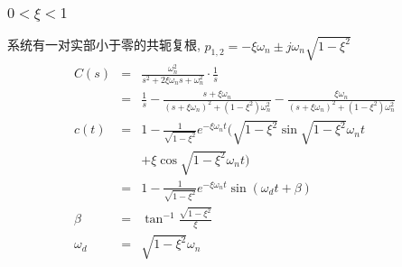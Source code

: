 \documentclass{article}
\begin{document}
\begin{frame}
\frametitle{$0<\xi<1$}
\label{sec-1-2-5}

   系统有一对实部小于零的共轭复根, $p_{1,2}  =  -\xi\omega_n\pm j\omega_n\sqrt{1-\xi^2}$
\begin{eqnarray*}
C(s) &=& \frac{\omega_n^2}{s^2+2\xi\omega_n s+\omega_n^2}\cdot\frac{1}{s} \\
     &=& \frac{1}{s}-\frac{s+\xi\omega_n}{(s+\xi\omega_n)^2+(1-\xi^2)\omega_n^2}-\frac{\xi\omega_n}{(s+\xi\omega_n)^2+(1-\xi^2)\omega_n^2} \\
c(t) &=& 1-\frac{1}{\sqrt{1-\xi^2}}e^{-\xi\omega_n t}(\sqrt{1-\xi^2}\sin\sqrt{1-\xi^2}\omega_n t \\
     & &+\xi\cos\sqrt{1-\xi^2}\omega_n t)\\
     &=& 1-\frac{1}{\sqrt{1-\xi^2}}e^{-\xi\omega_n t}\sin(\omega_d t+\beta)\\
\beta & = & \tan^{-1}\frac{\sqrt{1-\xi^2}}{\xi} \\
\omega_d &=& \sqrt{1-\xi^2}\omega_n
\end{eqnarray*}
\end{frame}
\end{document}
